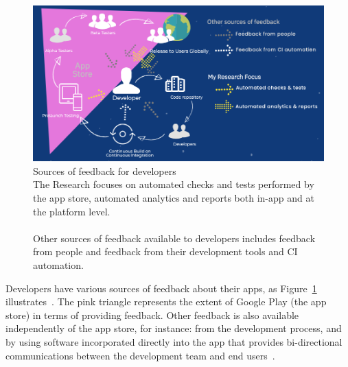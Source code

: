 \begin{figure}[htbp!]
    \includegraphics[width=\linewidth]{images/silvias-developer-centric-figure-mobilesoft2020.png}
    \caption[Sources of feedback for developers]{Sources of feedback for developers \\The Research focuses on automated checks and tests performed by the app store, automated analytics and reports both in-app and at the platform level. \\ \\Other sources of feedback available to developers includes feedback from people and feedback from their development tools and CI automation.}
    \label{fig:sources-of-feedback-for-developers}
\end{figure}

Developers have various sources of feedback about their apps, as Figure~\ref{fig:sources-of-feedback-for-developers} illustrates~. The pink triangle represents the extent of Google Play (the app store) in terms of providing feedback. Other feedback is also available independently of the app store, for instance: from the development process, and by using software incorporated directly into the app that provides bi-directional communications between the development team and end users~.


